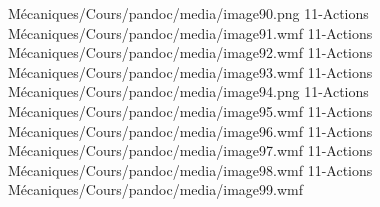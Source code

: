 Mécaniques/Cours/pandoc/media/image90.png 11-Actions Mécaniques/Cours/pandoc/media/image91.wmf 11-Actions Mécaniques/Cours/pandoc/media/image92.wmf 11-Actions Mécaniques/Cours/pandoc/media/image93.wmf 11-Actions Mécaniques/Cours/pandoc/media/image94.png 11-Actions Mécaniques/Cours/pandoc/media/image95.wmf 11-Actions Mécaniques/Cours/pandoc/media/image96.wmf 11-Actions Mécaniques/Cours/pandoc/media/image97.wmf 11-Actions Mécaniques/Cours/pandoc/media/image98.wmf 11-Actions Mécaniques/Cours/pandoc/media/image99.wmf
